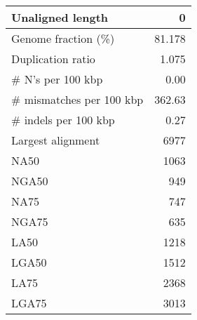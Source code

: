 \documentclass[12pt,a4paper]{article}
\begin{document}
\begin{table}[ht]
\begin{center}
\begin{tabular}{|l*{1}{|r}|}
Unaligned length & 0 \\ \hline
Genome fraction (\%) & 81.178 \\ \hline
Duplication ratio & 1.075 \\ \hline
\# N's per 100 kbp & 0.00 \\ \hline
\# mismatches per 100 kbp & 362.63 \\ \hline
\# indels per 100 kbp & 0.27 \\ \hline
Largest alignment & 6977 \\ \hline
NA50 & 1063 \\ \hline
NGA50 & 949 \\ \hline
NA75 & 747 \\ \hline
NGA75 & 635 \\ \hline
LA50 & 1218 \\ \hline
LGA50 & 1512 \\ \hline
LA75 & 2368 \\ \hline
LGA75 & 3013 \\ \hline
\end{tabular}
\end{center}
\end{table}
\end{document}
